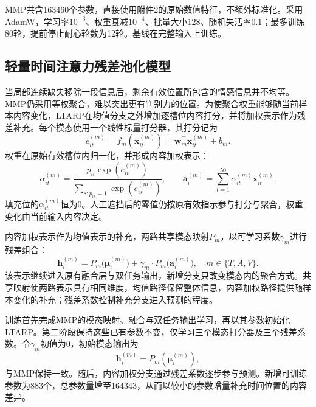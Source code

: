 \documentclass[UTF8,a4paper,11pt]{ctexart}
\newcommand{\QTwoParagraph}{\par\noindent\hspace*{2em}}
\newcounter{q2algorithm}
\begin{document}
\QTwoParagraph MMP共含163460个参数，直接使用附件2的原始数值特征，不额外标准化。采用AdamW，学习率$10^{-3}$、权重衰减$10^{-4}$、批量大小128、随机失活率0.1；最多训练80轮，提前停止耐心轮数为12轮。基线在完整输入上训练。

\subsection{轻量时间注意力残差池化模型}\label{subsec:q2_pool}
\QTwoParagraph 当局部连续缺失移除一段信息后，剩余有效位置所包含的情感信息并不均等。MMP仍采用等权聚合，难以突出更有判别力的位置。为使聚合权重能够随当前样本内容变化，LTARP在均值分支之外增加逐槽位内容打分，并将加权表示作为残差补充。每个模态使用一个线性标量打分器，其打分记为
\begin{equation}
e_{it}^{(m)} = f_m(\mathbf x_{it}^{(m)}) = \mathbf w_m^\top\mathbf x_{it}^{(m)} + b_m.
\end{equation}
权重在原始有效槽位内归一化，并形成内容加权表示：
\begin{equation}
\alpha_{it}^{(m)} = \frac{p_{it}\exp(e_{it}^{(m)})}{\sum_{s: p_{is}=1} \exp(e_{is}^{(m)})},\qquad
\mathbf a_i^{(m)} = \sum_{t=1}^{50} \alpha_{it}^{(m)} \mathbf x_{it}^{(m)}.
\label{eq:q2_alpha_softmax}
\end{equation}
填充位的$\alpha_{it}^{(m)}$恒为0。人工遮挡后的零值仍按原有效指示参与打分与聚合，权重变化由当前输入内容决定。

\QTwoParagraph 内容加权表示作为均值表示的补充，两路共享模态映射$P_m$，以可学习系数$\gamma_m$进行残差组合：
\begin{equation}
\mathbf h_i^{(m)} = P_m\big(\boldsymbol\mu_i^{(m)}\big) + \gamma_m \cdot P_m\big(\mathbf a_i^{(m)}\big), \quad m \in \{T, A, V\}.
\label{eq:q2_residual_composite}
\end{equation}
该表示继续进入原有融合层与双任务输出，新增分支只改变模态内的聚合方式。共享映射使两路表示具有相同维度，均值路径保留整体信息，内容加权路径提供随样本变化的补充；残差系数控制补充分支进入预测的程度。

\QTwoParagraph 训练首先完成MMP的模态映射、融合与双任务输出学习，再以其参数初始化LTARP。第二阶段保持这些已有参数不变，仅学习三个模态打分器及三个残差系数。令$\gamma_m$初值为0，初始模态输出为
\begin{equation}
\mathbf h_i^{(m)} = P_m(\boldsymbol\mu_i^{(m)}),
\end{equation}
与MMP保持一致。随后，内容加权分支通过残差系数逐步参与预测。新增可训练参数为883个，总参数量增至164343，从而以较小的参数增量补充时间位置的内容差异。
\end{document}
